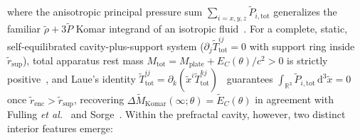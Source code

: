 \documentclass[aps,prd,twocolumn,10pt,showkeys,nofootinbib,floatfix,longbibliography]{revtex4-2}
\newcommand{\dd}{\mathrm{d}}
\begin{document}
where the anisotropic principal pressure sum $\sum_{i=x,y,z}\tilde{P}_{i,\mathrm{tot}}$ generalizes the familiar $\tilde{\rho} + 3\tilde{P}$ Komar integrand of an isotropic fluid~\cite{wald1984}. For a complete, static, self-equilibrated cavity-plus-support system ($\partial_j \tilde{T}^{ij}_{\mathrm{tot}} = 0$ with support ring inside $\tilde{r}_{\mathrm{sup}}$), total apparatus rest mass $M_{\mathrm{tot}} = M_{\mathrm{plate}} + E_C(\theta)/c^2 > 0$ is strictly positive~\cite{bekenstein2013prd,cerdonio2015fly,cerdonio2015ijmpd}, and Laue's identity $\tilde{T}^{ij}_{\mathrm{tot}} = \partial_k(\tilde{x}^i \tilde{T}^{kj}_{\mathrm{tot}})$~\cite{laue1911annphys} guarantees $\int_{\mathbb{R}^3} \tilde{P}_{i,\mathrm{tot}}\,\dd^3\tilde{x} = 0$ once $\tilde{r}_{\mathrm{enc}} > \tilde{r}_{\mathrm{sup}}$, recovering $\Delta\tilde{M}_{\mathrm{Komar}}(\infty; \theta) = \tilde{E}_C(\theta)$ in agreement with Fulling \emph{et al.}~\cite{fulling2007} and Sorge~\cite{sorge2021buoyancy}. Within the prefractal cavity, however, two distinct interior features emerge:
\end{document}

